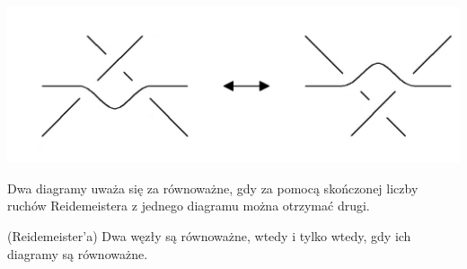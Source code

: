 \begin{definicja}
\begin{enumerate}
	\begin{minipage}{0.65\textwidth}
		\begin{center}
			\includegraphics[scale=0.2]{1/pictures/R3}
		\end{center}
	\end{minipage}
	
	\end{enumerate}
 
\end{definicja}

\begin{definicja}
 Dwa diagramy uważa się za równoważne, gdy za pomocą skończonej liczby ruchów Reidemeistera z jednego diagramu można otrzymać drugi.
\end{definicja}

\begin{twierdzenie}{(Reidemeister'a)}
Dwa węzły są równoważne, wtedy i tylko wtedy, gdy ich diagramy są równoważne.
\end{twierdzenie}

